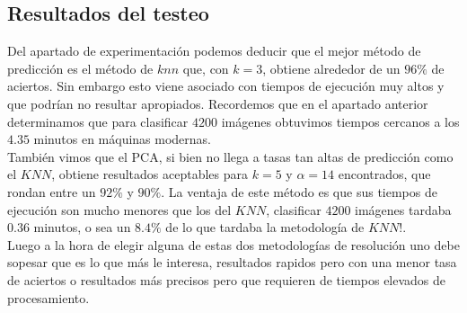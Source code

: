 \subsection{Resultados del testeo}
Del apartado de experimentación podemos deducir que el mejor método de predicción es el método de $knn$ que, con $k=3$, obtiene alrededor de un $96 \%$ de aciertos. Sin embargo esto viene asociado con tiempos de ejecución muy altos y que podrían no resultar apropiados. Recordemos que en el apartado anterior determinamos que para clasificar $4200$ imágenes obtuvimos tiempos cercanos a los $4.35$ minutos en máquinas modernas.
\\
También vimos que el PCA, si bien no llega a tasas tan altas de predicción como el $KNN$, obtiene resultados aceptables para $k = 5$ y $\alpha = 14$ encontrados, que rondan entre un $92 \%$ y $90 \%$. La ventaja de este método es que sus tiempos de ejecución son mucho menores que los del $KNN$, clasificar $4200$ imágenes tardaba $0.36$ minutos, o sea un $8.4 \%$ de lo que tardaba la metodología de $KNN$!. 
\\
Luego a la hora de elegir alguna de estas dos metodologías de resolución uno debe sopesar que es lo que más le interesa, resultados rapidos pero con una menor tasa de aciertos o resultados más precisos pero que requieren de tiempos elevados de procesamiento.
